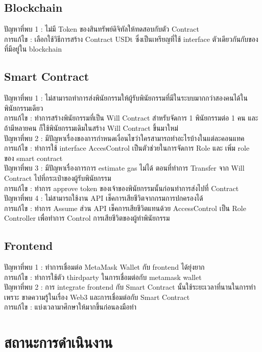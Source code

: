 \documentclass[12pt,oneside,openright,a4paper]{cpe-thai-project}
\begin{document}
\subsection{Blockchain}
\tab ปัญหาที่พบ 1 : ไม่มี Token ของสินทรัพย์ดิจิทัลให้ทดสอบกับตัว Contract \\
\tab การแก้ไข : เลือกใช้วิธีการสร้าง Contract USDt ซึ่งเป็นเหรียญที่ใช้ interface ตัวเดียวกันกับของที่มีอยู่ใน blockchain
\subsection{Smart Contract}
\tab ปัญหาที่พบ 1 : ไม่สามารถทำการส่งพินัยกรรมให้ผู้รับพินัยกรรมที่มีในระบบมากกว่าสองคนได้ใน พินัยกรรมเดียว\\
\tab การแก้ไข : ทำการสร้างพินัยกรรมที่เป็น Will Contract สำหรับจัดการ 1 พินัยกรรมต่อ 1 คน และถ้ามีหลายคน ก็ใช้พินัยกรรมเดิมในสร้าง Will Contract ขึ้นมาใหม่\\
\tab ปัญหาที่พบ 2 : มีปัญหาเรื่องของการกำหนดเงื่อนไขว่าใครสามารถทำอะไรบ้างในแต่ละคอนแทค\\
\tab การแก้ไข : ทำการใช้ interface AccesControl เป็นตัวช่วยในการจัดการ Role และ เพิ่ม role ของ smart contract\\
\tab ปัญหาที่พบ 3 : มีปัญหาเรื่องการการ estimate gas ไม่ได้ ตอนที่ทำการ Transfer จาก Will Contract ไปที่กระเป๋าของผู้รับพินัยกรรม\\
\tab การแก้ไข : ทำการ approve token ของเจ้าของพินัยกรรมนั้นก่อนทำการส่งไปที่ Contract\\
\tab ปัญหาที่พบ 4 : ไม่สามารถใช้งาน API เช็คการเสียชีวิตจากกรมการปกครองได้\\
\tab การแก้ไข : ทำการ Assume ส่วน API เช็คการเสียชีวิตแทนด้วย AccessControl เป็น Role Controller เพื่อทำการ Control การเสียชีวิตของผู้ทำพินัยกรรม
\subsection{Frontend}
\tab ปัญหาที่พบ 1 : ทำการเชื่อมต่อ MetaMask Wallet กับ frontend ได้ยุ่งยาก\\
\tab การแก้ไข : ทำการใช้ตัว thirdparty ในการเชื่อมต่อกับ metamask wallet\\
\tab ปัญหาที่พบ 2 : การ integrate frontend กับ Smart Contract นั้นใช้ระยะเวลาที่นานในการทำ เพราะ ขาดความรู้ในเรื่อง Web3 และการเชื่อมต่อกับ Smart Contract\\
\tab การแก้ไข : แบ่งเวลามาศึกษาให้มากขึ้นก่อนลงมือทำ\\
\section{สถานะการดำเนินงาน}
\end{document}
